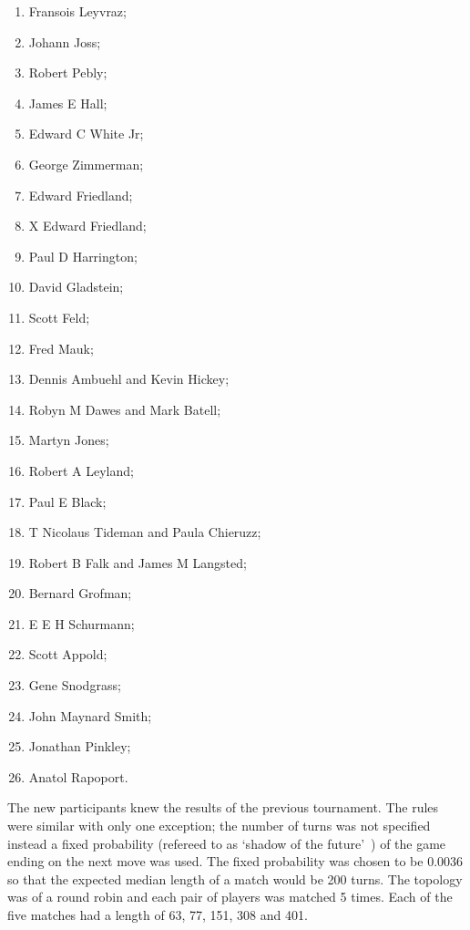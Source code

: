 \documentclass{article}
\theoremstyle{definition}
\begin{document}
\begin{multicols}{3}
\begin{enumerate}
        \item Fransois Leyvraz;
        \item Johann Joss;
        \item Robert Pebly;
        \item James E Hall;
        \item Edward C White Jr;
        \item George Zimmerman;
        \item Edward Friedland;
        \item X	Edward Friedland;
        \item Paul D Harrington;
        \item David Gladstein;
        \item Scott Feld;
        \item Fred Mauk;
        \item Dennis Ambuehl and Kevin Hickey;
        \item Robyn M Dawes and Mark Batell;
        \item Martyn Jones;
        \item Robert A Leyland;
        \item Paul E Black;
        \item T Nicolaus Tideman and Paula Chieruzz;
        \item Robert B Falk and James M Langsted;
        \item Bernard Grofman;
        \item E E H Schurmann;
        \item Scott Appold;
        \item Gene Snodgrass;
        \item John Maynard Smith;
        \item Jonathan Pinkley;
        \item Anatol Rapoport.
    \end{enumerate}
\end{multicols}

The new participants knew the results of the previous tournament. The rules
were similar with only one exception;
the number of turns was not specified instead a fixed probability (refereed to as
`shadow of the future'~\cite{Axelrod1988}) of the game ending on the next move
was used. The fixed probability was chosen to be 0.0036 so that the expected
median length of a match would be 200 turns. The topology was of a round robin
and each pair of players was matched 5 times. Each of the five matches had a
length of 63, 77, 151, 308 and 401.
\end{document}
